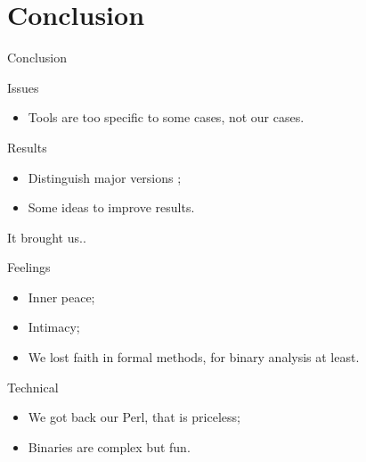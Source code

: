 \documentclass[11pt]{beamer}
\begin{document}
\section{Conclusion}

\begin{frame}{Conclusion}

	\begin{block}{Issues}
		\begin{itemize}
			\item Tools are too specific to some cases, not our cases.
		\end{itemize}
	\end{block}

	\begin{block}{Results}
		\begin{itemize}
			\item Distinguish major versions ;
            \item Some ideas to improve results.
		\end{itemize}
	\end{block}
\end{frame}


\begin{frame}{It brought us..}


\begin{block}{Feelings}
	\begin{itemize}
		\item Inner peace;
        \item Intimacy;
        \item We lost faith in formal methods, for binary analysis at least.
	\end{itemize}
\end{block}

\begin{block}{Technical}
	\begin{itemize}
        \item We got back our Perl, that is priceless;
		\item Binaries are complex but fun.
	\end{itemize}
	
\end{block}

\end{frame}
\end{document}
